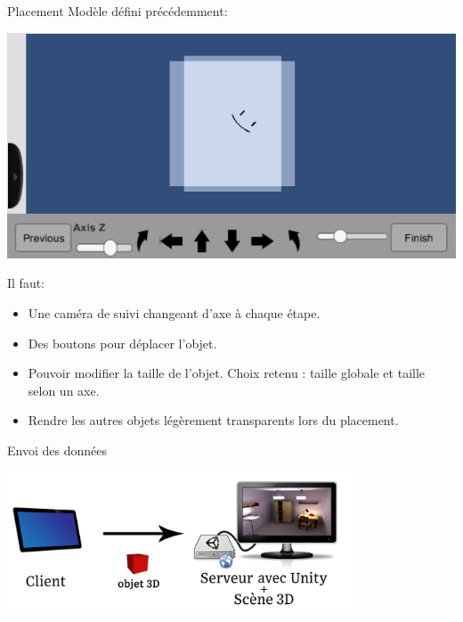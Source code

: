 \documentclass[a4paper,10pt]{beamer}
\begin{document}
	
	\begin{frame}{Placement}
			Modèle défini précédemment:
					\centerline{\includegraphics[scale=0.4]{images/Nono/img4.png}} 
					Il faut:
			\begin{itemize}
				\item Une caméra de suivi changeant d'axe à chaque étape.
				\item Des boutons pour déplacer l'objet.
				\item Pouvoir modifier la taille de l'objet. Choix retenu : taille globale et taille selon un axe.
				\item Rendre les autres objets légèrement transparents lors du placement.

			\end{itemize}
					
	\end{frame}
	
	
	\begin{frame}{Envoi des données}
		\centerline{\includegraphics[height=120pt]{images/network/sending_model2.png}}
	\end{frame}
	
\end{document}
